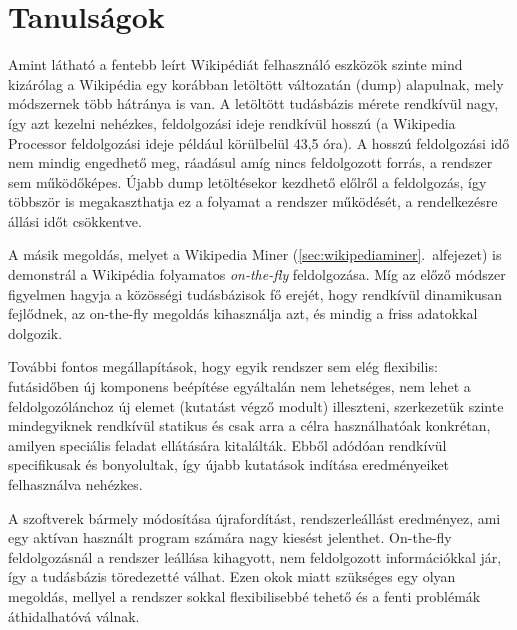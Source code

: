 
\section{Tanulságok}
\label{sec:conclusion}

Amint látható a fentebb leírt Wikipédiát felhasználó eszközök szinte mind kizárólag a Wikipédia egy korábban letöltött változatán (dump) alapulnak, mely módszernek több hátránya is van. A letöltött tudásbázis mérete rendkívül nagy, így azt kezelni nehézkes, feldolgozási ideje rendkívül hosszú (a Wikipedia Processor feldolgozási ideje például körülbelül 43,5 óra). A hosszú feldolgozási idő nem mindig engedhető meg, ráadásul amíg nincs feldolgozott forrás, a rendszer sem működőképes. Újabb dump letöltésekor kezdhető előlről a feldolgozás, így többször is megakaszthatja ez a folyamat a rendszer működését, a rendelkezésre állási időt csökkentve.

A másik megoldás, melyet a Wikipedia Miner (\ref{sec:wikipediaminer}.~alfejezet) is demonstrál a Wikipédia folyamatos \textit{on-the-fly} feldolgozása. Míg az előző módszer figyelmen hagyja a közösségi tudásbázisok fő erejét, hogy rendkívül dinamikusan fejlődnek, az on-the-fly megoldás kihasználja azt, és mindig a friss adatokkal dolgozik.

További fontos megállapítások, hogy egyik rendszer sem elég flexibilis: futásidőben új komponens beépítése egyáltalán nem lehetséges, nem lehet a feldolgozólánchoz új elemet (kutatást végző modult) illeszteni, szerkezetük szinte mindegyiknek rendkívül statikus és csak arra a célra használhatóak konkrétan, amilyen speciális feladat ellátására kitalálták. Ebből adódóan rendkívül specifikusak és bonyolultak, így újabb kutatások indítása eredményeiket felhasználva nehézkes.

A szoftverek bármely módosítása újrafordítást, rendszerleállást eredményez, ami egy aktívan használt program számára nagy kiesést jelenthet. On-the-fly feldolgozásnál a rendszer leállása kihagyott, nem feldolgozott információkkal jár, így a tudásbázis töredezetté válhat. Ezen okok miatt szükséges egy olyan megoldás, mellyel a rendszer sokkal flexibilisebbé tehető és a fenti problémák áthidalhatóvá válnak.


